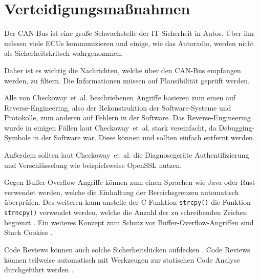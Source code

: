 \section{Verteidigungsmaßnahmen}\label{sec:defense}
Der CAN-Bus ist eine große Schwachstelle der IT-Sicherheit in Autos. Über ihn
müssen viele ECUs kommunizieren und einige, wie das Autoradio, werden nicht als
Sicherheitskritsch wahrgenommen.

Daher ist es wichtig die Nachrichten, welche über den CAN-Bus empfangen werden,
zu filtern. Die Informationen müssen auf Plausibilität geprüft werden.

Alle von Checkoway~et~al. beschriebenen Angriffe basieren zum einen auf
Reverse-Engineering, also der Rekonstruktion der Software-Systeme und
Protokolle, zum anderen auf Fehlern in der Software. Das Reverse-Engineering
wurde in einigen Fällen laut Checkoway~et~al. stark vereinfacht, da
Debugging-Symbole in der Software war. Diese können und sollten einfach
entfernt werden.

Außerdem sollten laut Checkoway~et~al. die Diagnosegeräte Authentifizierung und
Verschlüsselung wie beispielsweise OpenSSL nutzen.

Gegen Buffer-Overflow-Angriffe können zum einen Sprachen wie Java oder Rust
verwendet werden, welche die Einhaltung der Bereichsgrenzen automatisch
überprüfen. Des weiteren kann anstelle der C-Funktion \verb+strcpy()+ die
Funktion \verb+strncpy()+ verwendet werden, welche die Anzahl der zu
schreibenden Zeichen begrenzt \cite{Eckert2012}. Ein weiteres Konzept zum
Schutz vor Buffer-Overflow-Angriffen sind Stack Cookies \cite{Bray2002}.

Code Reviews können auch solche Sicherheitslücken aufdecken \cite{Howard2006}.
Code Reviews können teilweise automatisch mit Werkzeugen zur statischen Code
Analyse durchgeführt werden \cite{McGraw2008}.